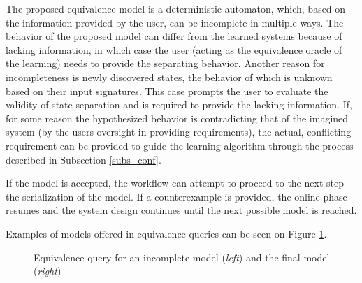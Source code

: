 The proposed equivalence model is a deterministic automaton, which, based on the information provided by the user, can be incomplete in multiple ways. The behavior of the proposed model can differ from the learned systems because of lacking information, in which case the user (acting as the equivalence oracle of the learning) needs to provide the separating behavior. Another reason for incompleteness is newly discovered states, the behavior of which is unknown based on their input signatures. This case prompts the user to evaluate the validity of state separation and is required to provide the lacking information. If, for some reason the hypothesized behavior is contradicting that of the imagined system (by the users oversight in providing requirements), the actual, conflicting requirement can be provided to guide the learning algorithm through the process described in Subsection \ref{subs_conf}.

If the model is accepted, the workflow can attempt to proceed to the next step - the serialization of the model. If a counterexample is provided, the online phase resumes and the system design continues until the next possible model is reached.

Examples of models offered in equivalence queries can be seen on Figure \ref{fig_methodology_eqex}.

\begin{figure}[!ht] 
	\centering
	\caption{Equivalence query for an incomplete model (\textit{left}) and the final model (\textit{right})}
	\label{fig_methodology_eqex}
\end{figure}

